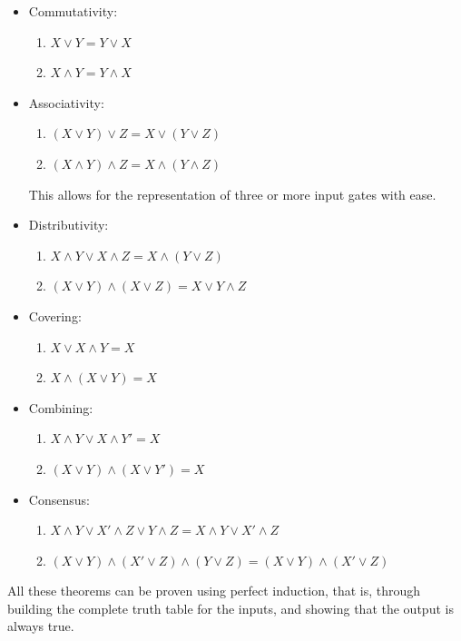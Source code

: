 \documentclass[nobib]{tufte-handout}
\begin{document}
\begin{itemize}
    \item Commutativity:
          \begin{enumerate}
              \item $X\lor Y=Y\lor X$
              \item $X\land Y = Y\land X$
          \end{enumerate}
    \item Associativity: \begin{enumerate}
              \item $(X\lor Y)\lor Z=X\lor (Y\lor Z)$
              \item $(X\land Y)\land Z=X\land (Y\land Z)$
          \end{enumerate}
          This allows for the representation of three or more input gates with ease.
    \item Distributivity:
          \begin{enumerate}
              \item $X\land Y \lor X\land Z = X\land(Y \lor Z)$
              \item $(X\lor Y)\land (X\lor Z) = X\lor Y\land Z$
          \end{enumerate}
    \item Covering:
          \begin{enumerate}
              \item $X\lor X\land Y = X$
              \item $X\land(X\lor Y) = X$
          \end{enumerate}
    \item Combining:
          \begin{enumerate}
              \item $X\land Y \lor X\land Y' = X$
              \item $(X\lor Y)\land (X\lor Y')=X$
          \end{enumerate}
    \item Consensus:
          \begin{enumerate}
              \item $X \land Y \lor X' \land Z \lor Y \land Z = X \land Y \lor X' \land Z$
              \item $(X \lor Y ) \land (X' \lor Z ) \land (Y \lor Z ) = (X \lor Y ) \land (X' \lor Z)$
          \end{enumerate}
\end{itemize}
All these theorems can be proven using perfect induction, that is, through building the complete truth table for the inputs, and showing that the output is always true.\\
\end{document}
